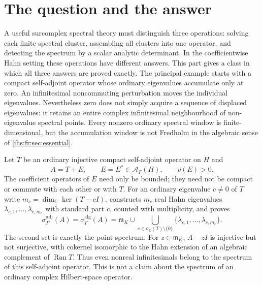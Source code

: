 \documentclass[11pt,a4paper]{article}
\numberwithin{equation}{section}
\theoremstyle{definition}
\theoremstyle{remark}
\newcommand{\C}{\mathbb C}
\newcommand{\mK}{\mathfrak m_K}
\newcommand{\Ahh}{\mathcal A_\Gamma(H)}
\newcommand{\Ran}{\operatorname{Ran}}
\begin{document}
\section{The question and the answer}\label{ihs:fr:sec:intro}

A useful surcomplex spectral theory must distinguish three operations:
solving each finite spectral cluster, assembling all clusters into one
operator, and detecting the spectrum by a scalar analytic determinant. In
the coefficientwise Hahn setting these operations have different answers.
This part gives a class in which all three answers are proved exactly. The
principal example starts with a compact self-adjoint operator whose ordinary
eigenvalues accumulate only at zero. An infinitesimal noncommuting
perturbation moves the individual eigenvalues. Nevertheless zero does not
simply acquire a sequence of displaced eigenvalues: it retains an entire
complex infinitesimal neighbourhood of non-eigenvalue spectral points. Every
nonzero ordinary spectral window is finite-dimensional, but the accumulation
window is not Fredholm in the algebraic sense of \cref{ihs:fr:sec:essential}.

Let $T$ be an ordinary injective compact self-adjoint operator on $H$ and
\begin{equation}\label{ihs:fr:eq:perturbation}
 A=T+E,\qquad E=E^*\in\Ahh,\qquad v(E)>0.
\end{equation}
The coefficient operators of $E$ need only be bounded; they need not be
compact or commute with each other or with $T$. For an ordinary eigenvalue
$c\ne0$ of $T$ write $m_c=\dim_\C\ker(T-cI)$. 
constructs $m_c$ real Hahn eigenvalues $\lambda_{c,1},\ldots,\lambda_{c,m_c}$
with standard part $c$, counted with multiplicity, and proves
\begin{equation}\label{ihs:fr:eq:headline}
 \sigma^{\mathrm{adj}}_\Gamma(A)=\sigma^{\mathrm{alg}}_\Gamma(A)
 =\mK\cup\bigcup_{c\in\sigma_\C(T)\setminus\{0\}}
 \{\lambda_{c,1},\ldots,\lambda_{c,m_c}\}.
\end{equation}
The second set is exactly the point spectrum. For $z\in\mK$, $A-zI$ is
injective but not surjective, with cokernel isomorphic to the Hahn extension
of an algebraic complement of $\Ran T$. Thus even nonreal infinitesimals
belong to the spectrum of this self-adjoint operator. This is not a claim
about the spectrum of an ordinary complex Hilbert-space operator.
\end{document}
